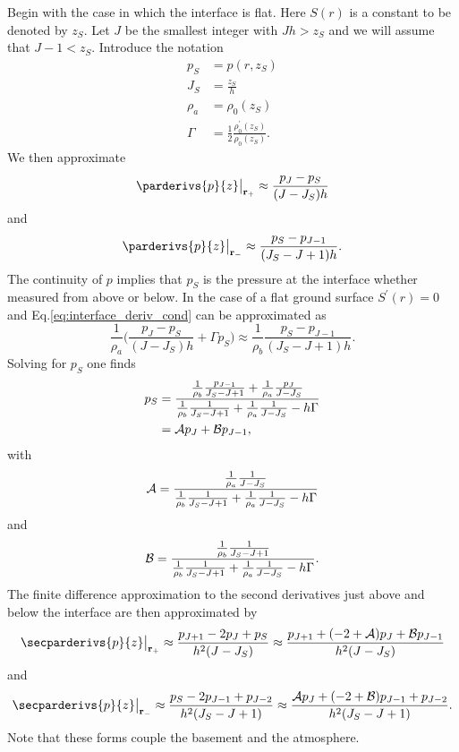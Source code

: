 Begin with the case in which the interface is flat. Here $S(r)$ is a constant to be denoted by $z_S$. Let $J$ be the smallest integer with $Jh>z_S$ and we will assume that $J-1<z_S$. Introduce the notation 
\begin{equation}
\begin{aligned}
p_S &=p(r,z_S)\\
J_S &=\frac{z_S}{h}\\
\rho_a &=\rho_0(z_S)\\
\Gamma &=\frac{1}{2}\frac{\rho_0^\prime(z_S)}{\rho_0(z_S)}.
\end{aligned}
\label{eg_flat_gnd_defs}\end{equation} 
We then approximate 
\[
\parderivs{p}{z}\big|_{{\bf r}_+}\approx\frac{p_J-p_S}{(J-J_S)h}
\]
and
\[
\parderivs{p}{z}\big|_{{\bf r}_-}\approx\frac{p_S-p_{J-1}}{(J_S-J+1)h}.
\]
The continuity of $p$ implies that $p_S$ is the pressure at the interface whether measured from above or below. In the case of a flat ground surface $S^\prime(r)=0$ and Eq.\ref{eq:interface_deriv_cond} can be approximated as 
\[
\frac{1}{\rho_a}\Big(\frac{p_J-p_S}{(J-J_S)h}+\Gamma p_S\Big)
\approx
\frac{1}{\rho_b}\frac{p_S-p_{J-1}}{(J_S-J+1)h}.
\]
Solving for $p_S$ one finds 
\[
\begin{aligned}
p_S
&=
\frac{\frac{1}{\rho_b}\frac{p_{J-1}}{J_S-J+1}+\frac{1}{\rho_a}\frac{p_J}{J-J_S}}
{\frac{1}{\rho_b}\frac{1}{J_S-J+1}+\frac{1}{\rho_a}\frac{1}{J-J_S}-h\Gamma}\\
&=
{\cal A}p_J+{\cal B}p_{J-1}, 
\end{aligned}
\]
with
\[
{\cal A}
=
\frac{\frac{1}{\rho_a}\frac{1}{J-J_S}}
{\frac{1}{\rho_b}\frac{1}{J_S-J+1}+\frac{1}{\rho_a}\frac{1}{J-J_S}-h\Gamma}
\]
and
\[
{\cal B}
=
\frac{\frac{1}{\rho_b}\frac{1}{J_S-J+1}}
{\frac{1}{\rho_b}\frac{1}{J_S-J+1}+\frac{1}{\rho_a}\frac{1}{J-J_S}-h\Gamma}.
\]
The finite difference approximation to the second derivatives just above and below the interface are then approximated by
\[
\secparderivs{p}{z}\big|_{{\bf r}_+}
\approx\frac{p_{J+1}-2p_J+p_S}{h^2(J-J_S)}
\approx\frac{p_{J+1}+(-2+{\cal A})p_J+{\cal B}p_{J-1}}{h^2(J-J_S)}
\] 
and 
\[
\secparderivs{p}{z}\big|_{{\bf r}_-}
\approx\frac{p_S-2p_{J-1}+p_{J-2}}{h^2(J_S-J+1)}
\approx\frac{{\cal A}p_J+(-2+{\cal B})p_{J-1}+p_{J-2}}{h^2(J_S-J+1)}.
\]
Note that these forms couple the basement and the atmosphere. 

